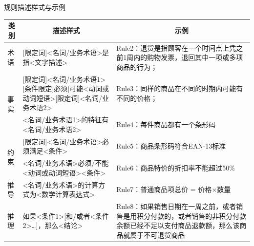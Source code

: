 规则描述样式与示例
\vspace{-0.8em}
\begin{center}
    \begin{longtable}{|m{0.8cm}<{\centering}|m{6.5cm}|m{6.5cm}|}
        \hline
        \multicolumn{1}{|c|}{类别}    &     \multicolumn{1}{c|}{描述样式}    &    \multicolumn{1}{c|}{示例}                                                   \\ \hline
        术语                  & {[}限定词{]}\textless{}名词/业务术语\textgreater{}是指\textless{}文字描述\textgreater{}                                                            & Rule2：退货是指顾客在一个时间点上凭之前1周内的购物发票，退回其中一项或多项商品的行为；                        \\ \hline
        \multirow{2}{*}{事实} & {[}限定词{]}\textless{}名词/业务术语1\textgreater{}{[}条件限定{]}必须|可能\textless{}动词或动词短语\textgreater{}{[}限定词{]}\textless{}名词/业务术语2\textgreater{} & Rule3：同样的商品在不同的时期内可能有不同的价格；                                           \\ \cline{2-3} 
                            & \textless{}名词/业务术语1\textgreater{}的特征有\textless{}名词/业务术语2\textgreater{}                                                              & Rule4：每件商品都有一个条形码                                                     \\ \hline
        \multirow{2}{*}{约束} & {[}限定词{]}\textless{}名词/业务术语\textgreater{}必须满足\textless{}条件\textgreater{}                                                            & Rule5：商品条形码符合EAN-13标准                                                 \\ \cline{2-3} 
                            & \textless{}名词/业务术语\textgreater{}必须/不能\textless{}动词或动词短语\textgreater{}\textless{}条件\textgreater{}                                    & Rule6：商品特价的折扣率不能超过50\%                                                \\ \hline
        推导                  & \textless{}名词/业务术语\textgreater{}的计算方式为\textless{}数学计算表达式\textgreater{}                                                              & Rule7：普通商品项总价 = 价格×数量                                                 \\ \hline
        推理                  & 如果\textless{}条件1\textgreater{}{[}和/或者\textless{}条件2\textgreater{}…{]}，那么\textless{}结论\textgreater{}                                 & Rule8：如果销售日期在一周之前，或者销售是用积分付款的，或者销售的非积分付款余额已经不足以支付商品退款额，那么该商品就属于不可退货商品 \\ \hline
    \end{longtable}
\end{center}
\vspace{-3.7em}

